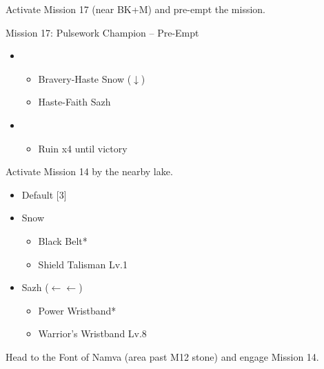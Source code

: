 Activate Mission 17 (near BK+M) and pre-empt the mission.

\begin{battle}{Mission 17: Pulsework Champion -- Pre-Empt}
	\begin{itemize}
		\item \first
			\begin{itemize}
				\item Bravery-Haste Snow ($\downarrow$)
				\item Haste-Faith Sazh
			\end{itemize}
		\item \fifth
			\begin{itemize}
				\item Ruin x4 until victory
			\end{itemize}
	\end{itemize}
\end{battle}

Activate Mission 14 by the nearby lake.

\begin{menu}
	\begin{itemize}
		\paradigm
		\begin{itemize}
			\item Default [3]
		\end{itemize}
		\equip
		\begin{itemize}
			\item Snow
			    \begin{itemize}
				    \item Black Belt*
				    \item Shield Talisman Lv.1
			    \end{itemize}
			\item Sazh ($\leftarrow\leftarrow$)
				\begin{itemize}
					\item Power Wristband*
					\item Warrior's Wristband Lv.8
				\end{itemize}
		\end{itemize}
	\end{itemize}
\end{menu}

Head to the Font of Namva (area past M12 stone) and engage Mission 14.

